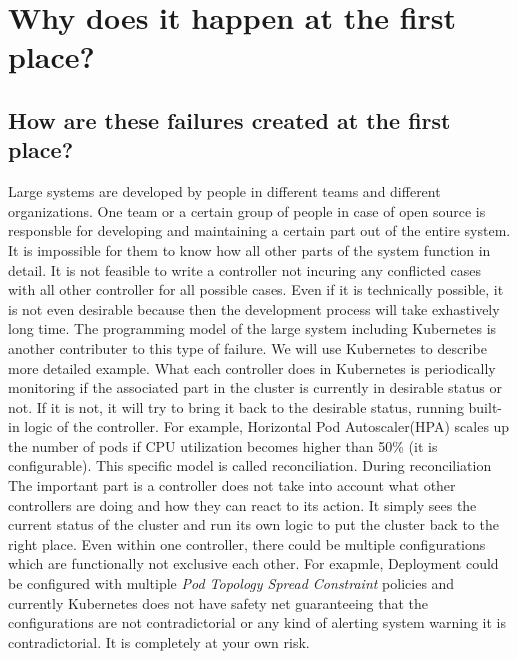 \section{Why does it happen at the first place?}
\label{sec:why}

\subsection*{How are these failures created at the first place?}
Large systems are developed by people in different teams and different organizations. One team or a certain group of people in case of open source is responsble for developing and maintaining a certain part out of the entire system. It is impossible for them to know how all other parts of the system function in detail. It is not feasible to write a controller not incuring any conflicted cases with all other controller for all possible cases. Even if it is technically possible, it is not even desirable because then the development process will take exhastively long time.
The programming model of the large system including Kubernetes is another contributer to this type of failure. We will use Kubernetes to describe more detailed example. What each controller does in Kubernetes is periodically monitoring if the associated part in the cluster is currently in desirable status or not. If it is not, it will try to bring it back to the desirable status, running built-in logic of the controller. For example, Horizontal Pod Autoscaler(HPA) scales up the number of pods if CPU utilization becomes higher than 50\% (it is configurable). This specific model is called reconciliation. During reconciliation The important part is a controller does not take into account what other controllers are doing and how they can react to its action. It simply sees the current status of the cluster and run its own logic to put the cluster back to the right place.
Even within one controller, there could be multiple configurations which are functionally not exclusive each other. For exapmle, Deployment could be configured with multiple \textit{Pod Topology Spread Constraint} policies and currently Kubernetes does not have safety net guaranteeing that the configurations are not contradictorial or any kind of alerting system warning it is contradictorial. It is completely at your own risk.


